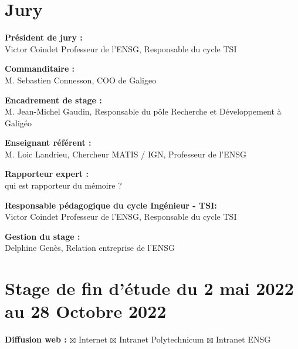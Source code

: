 \thispagestyle{plain}
\section*{Jury}
\vspace{0.5cm}

\textbf{Président de jury :} \\

Victor Coindet
Professeur de l'ENSG, Responsable du cycle TSI

\vspace{0.5cm}

\textbf{Commanditaire :} \\

M. Sebastien Connesson, COO de Galigeo

\vspace{0.5cm}

\textbf{Encadrement de stage :} \\ 

M. Jean-Michel Gaudin, Responsable du pôle Recherche et Développement à Galigéo

\vspace{0.5cm}

\textbf{Enseignant référent :} \\ 

M. Loic Landrieu, Chercheur MATIS / IGN, Professeur de l'ENSG

\vspace{0.5cm}

\textbf{Rapporteur expert :} \\ 

qui est rapporteur du mémoire ?

\vspace{0.5cm}

\textbf{Responsable pédagogique du cycle Ingénieur - TSI:} \\

Victor Coindet
Professeur de l'ENSG, Responsable du cycle TSI

\vspace{0.5cm}

\textbf{Gestion du stage :} \\ 

Delphine Genès, Relation entreprise de l'ENSG

\vspace{0.5cm}


\section*{Stage de fin d'étude du 2 mai 2022 au 28 Octobre 2022}
\vspace{0.3cm}
\textbf{Diffusion web :} $\boxtimes$ Internet \hspace{0.2cm}$\boxtimes$ Intranet Polytechnicum\hspace{0.2cm}
$\boxtimes$ Intranet ENSG\vspace{0.3cm}

